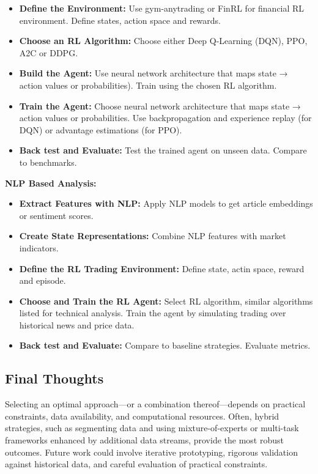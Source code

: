 \documentclass[twocolumn]{article}
\begin{document}
\begin{itemize}
    \item \textbf{Define the Environment:} Use gym-anytrading or FinRL for financial RL environment. Define states, action space and rewards.
    \item \textbf{Choose an RL Algorithm:} Choose either Deep Q-Learning (DQN), PPO, A2C or DDPG.
    \item \textbf{Build the Agent:} Use neural network architecture that maps state → action values or probabilities). Train using the chosen RL algorithm.
    \item \textbf{Train the Agent:} Choose neural network architecture that maps state → action values or probabilities. Use backpropagation and experience replay (for DQN) or advantage estimations (for PPO). 
    \item \textbf{Back test and Evaluate:} Test the trained agent on unseen data. Compare to benchmarks.
\end{itemize}

\textbf{NLP Based Analysis:}
\begin{itemize}
    \item \textbf{Extract Features with NLP:} Apply NLP models to get article embeddings or sentiment scores.
    \item \textbf{Create State Representations:} Combine NLP features with market indicators. 
    \item \textbf{Define the RL Trading Environment:} Define state, actin space, reward and episode.
    \item \textbf{Choose and Train the RL Agent:} Select RL algorithm, similar algorithms listed for technical analysis. Train the agent by simulating trading over historical news and price data.
    \item \textbf{Back test and Evaluate:} Compare to baseline strategies. Evaluate metrics. 
\end{itemize}



\subsection{Final Thoughts}

Selecting an optimal approach—or a combination thereof—depends on practical constraints, data availability, and computational resources. Often, hybrid strategies, such as segmenting data and using mixture-of-experts or multi-task frameworks enhanced by additional data streams, provide the most robust outcomes. Future work could involve iterative prototyping, rigorous validation against historical data, and careful evaluation of practical constraints.
\end{document}
